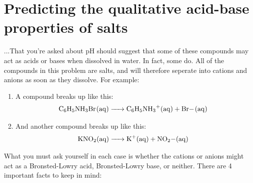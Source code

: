 \documentclass{article}  %
\begin{document}
\section*{Predicting the qualitative acid-base properties of salts}
...That you're asked about pH should suggest that some of these compounds may act as acids or bases when dissolved in water. In fact, some do.
\newline
All of the compounds in this problem are salts, and will therefore seperate into cations and anions as soon as they dissolve.
\newline
For example:
\begin{enumerate}
    \item A compound  breaks up like this:
    \begin{equation*}
        \begin{aligned}
            \ce{C6H5NH3Br_(aq) -> C6H5NH3+_(aq) + Br-_(aq)} 
        \end{aligned}
    \end{equation*}
    \item And another compound  breaks up like this:
    \begin{equation*}
        \begin{aligned}
            \ce{KNO2_(aq) -> K+_(aq) + NO2-_(aq)}
        \end{aligned}
    \end{equation*}
\end{enumerate}
What you must ask yourself in each case is whether the cations or anions might act as a Bronsted-Lowry acid, Bronsted-Lowry base, or neither.
\newline
There are 4 important facts to keep in mind:
\end{document}
